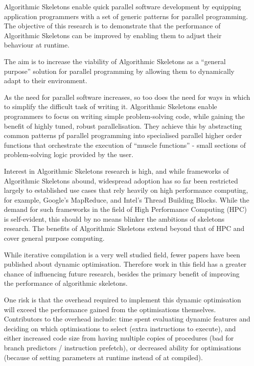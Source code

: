 Algorithmic Skeletons enable quick parallel software development by
equipping application programmers with a set of generic patterns for
parallel programming. The objective of this research is to demonstrate
that the performance of Algorithmic Skeletons can be improved by
enabling them to adjust their behaviour at runtime.

The aim is to increase the viability of Algorithmic Skeletons as a
“general purpose” solution for parallel programming by allowing them
to dynamically adapt to their environment.

As the need for parallel software increases, so too does the need for
ways in which to simplify the difficult task of writing
it. Algorithmic Skeletons enable programmers to focus on writing
simple problem-solving code, while gaining the benefit of highly
tuned, robust parallelisation. They achieve this by abstracting common
patterns pf parallel programming into specialised parallel higher
order functions that orchestrate the execution of ``muscle functions''
- small sections of problem-solving logic provided by the user.

Interest in Algorithmic Skeletons research is high, and while
frameworks of Algorithmic Skeletons abound, widespread adoption has so
far been restricted largely to established use cases that rely heavily
on high performance computing, for example, Google's MapReduce, and
Intel's Thread Building Blocks. While the demand for such frameworks
in the field of High Performance Computing (HPC) is self-evident, this
should by no means blinker the ambitions of skeletons research. The
benefits of Algorithmic Skeletons extend beyond that of HPC and cover
general purpose computing.

While iterative compilation is a very well studied field, fewer papers
have been published about dynamic optimisation. Therefore work in this
field has a greater chance of influencing future research, besides the
primary benefit of improving the performance of algorithmic skeletons.

One risk is that the overhead required to implement this dynamic
optimisation will exceed the performance gained from the optimisations
themselves. Contributors to the overhead include: time spent
evaluating dynamic features and deciding on which optimisations to
select (extra instructions to execute), and either increased code size
from having multiple copies of procedures (bad for branch predictors /
instruction prefetch), or decreased ability for optimisations (because
of setting parameters at runtime instead of at compiled).

